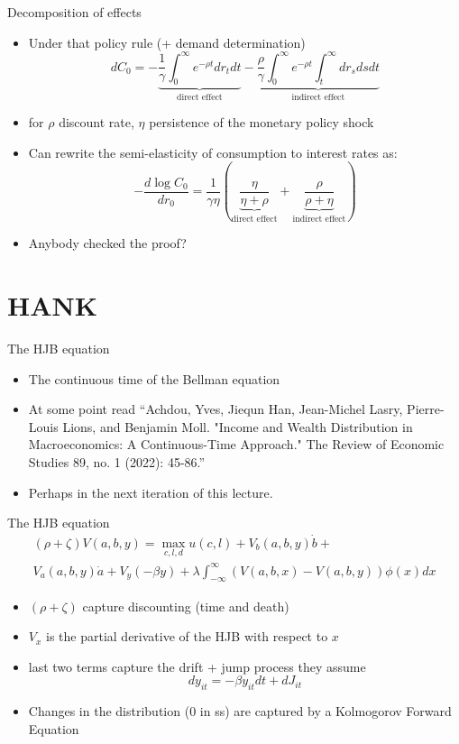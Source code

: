 \documentclass[english,xcolor=svgnames]{beamer}
\begin{document}
\begin{frame}{Decomposition of effects}
\begin{itemize}
\item Under that policy rule (+ demand determination)
\[dC_0 = - \underbrace{\frac{1}{\gamma} \int_0^{\infty} e^{-\rho t}dr_t dt}_{\text{direct effect}} - \underbrace{\frac{\rho}{\gamma}  \int_0^{\infty} e^{-\rho t} \int_t^{\infty} d r_s ds dt}_{\text{indirect effect}} \]
\item for $\rho$ discount rate, $\eta$ persistence of the monetary policy shock
\item Can rewrite the semi-elasticity of consumption to interest rates as:
\[-\frac{d\log C_0}{dr_0} = \frac{1}{\gamma \eta} \left(\underbrace{\frac{\eta}{\eta + \rho}}_{\text{direct effect}}+ \underbrace{\frac{\rho}{\rho + \eta}}_{\text{indirect effect}}\right)\]
\item Anybody checked the proof?
\end{itemize}
\end{frame}


\section{HANK}

\begin{frame}{The HJB equation}
\begin{itemize}
\item The continuous time of the Bellman equation
\item At some point read ``Achdou, Yves, Jiequn Han, Jean-Michel Lasry, Pierre-Louis Lions, and Benjamin Moll. "Income and Wealth Distribution in Macroeconomics: A Continuous-Time Approach." The Review of Economic Studies 89, no. 1 (2022): 45-86.''
\item Perhaps in the next iteration of this lecture.
\end{itemize}
\end{frame}

\begin{frame}{The HJB equation}
\begin{multline*}
(\rho + \zeta) V(a,b,y) = \max_{c,l,d} u(c,l) + V_b(a,b,y)\dot{b} + \\ V_a(a,b,y) \dot{a} +  V_y(-\beta y) + \lambda \int_{-\infty}^{\infty}(V(a,b,x) - V(a,b,y)) \phi(x) dx
\end{multline*}
\begin{itemize}
\item $(\rho + \zeta)$ capture discounting (time and death)
\item $V_x$ is the partial derivative of the HJB with respect to $x$
\item last two terms capture the drift + jump process they assume
\[d y_{it}  = -\beta y_{it} dt + dJ_{it}\]
\item Changes in the distribution (0 in ss) are captured by a Kolmogorov Forward Equation
\end{itemize}
\end{frame}
\end{document}
